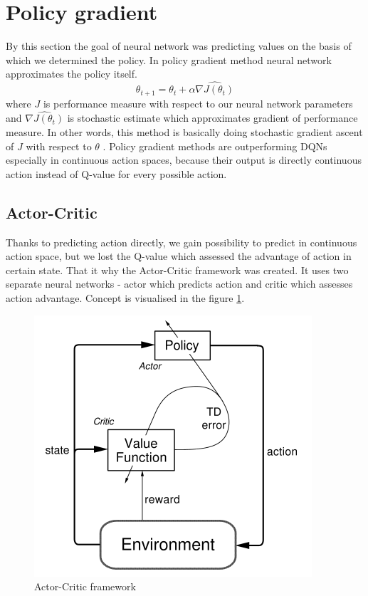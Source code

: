 \section{Policy gradient}
By this section the goal of neural network was predicting values on the basis of which we determined the policy. In policy gradient method neural network approximates the policy itself. 
\begin{equation}
\theta_{t+1} = \theta_t + \alpha \widehat{\nabla J(\theta_t)}
\end{equation}
where $J$ is performance measure with respect to our neural network parameters and $\widehat{\nabla J(\theta_t)}$ is stochastic estimate which approximates gradient of performance measure. In other words, this method is basically doing stochastic gradient ascent of $J$ with respect to $\theta$ \cite{sutton1999}. Policy gradient methods are outperforming DQNs especially in continuous action spaces, because their output is directly continuous action instead of Q-value for every possible action.

\subsection{Actor-Critic}
Thanks to predicting action directly, we gain possibility to predict in continuous action space, but we lost the Q-value which assessed the advantage of action in certain state. That it why the Actor-Critic framework was created. It uses two separate neural networks - actor which predicts action and critic which assesses action advantage. Concept is visualised in the figure \ref{fig:actorcritic}.
\begin{figure}[H]
\centering
\includegraphics[scale=0.55]{fig/actor-critic.png}
\caption{Actor-Critic framework}
\label{fig:actorcritic}
\end{figure}
\pagebreak

